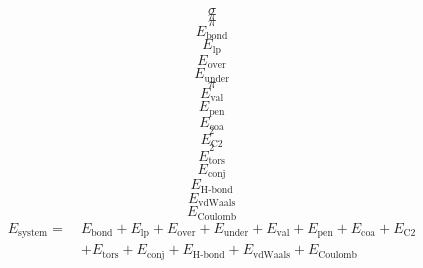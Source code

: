 \documentclass{scrreprt}
\begin{document}
\begin{equation}
\sigma
\end{equation}
\begin{equation}
\pi
\end{equation}
\begin{equation}
\pi
\end{equation}
\begin{equation}
E_\text{bond}
\end{equation}
\begin{equation}
E_\text{lp}
\end{equation}
\begin{equation}
E_\text{over}
\end{equation}
\begin{equation}
E_\text{under}
\end{equation}
\begin{equation}
\pi
\end{equation}
\begin{equation}
E_\text{val}
\end{equation}
\begin{equation}
E_\text{pen}
\end{equation}
\begin{equation}
E_\text{coa}
\end{equation}
\begin{equation}
_2
\end{equation}
\begin{equation}
E_\text{C2}
\end{equation}
\begin{equation}
_2
\end{equation}
\begin{equation}
E_\text{tors}
\end{equation}
\begin{equation}
E_\text{conj}
\end{equation}
\begin{equation}
E_\text{H-bond}
\end{equation}
\begin{equation}
E_\text{vdWaals}
\end{equation}
\begin{equation}
E_\text{Coulomb}
\end{equation}
\begin{align}
  \label{eq:reaxformulation}
  E_\text{system} =~& E_\text{bond} + E_\text{lp} + E_\text{over} + E_\text{under} + E_\text{val} + E_\text{pen} + E_\text{coa} + E_\text{C2} \\
  \nonumber  & + E_\text{tors} + E_\text{conj} + E_\text{H-bond} + E_\text{vdWaals} + E_\text{Coulomb}
\end{align}
\end{document}
